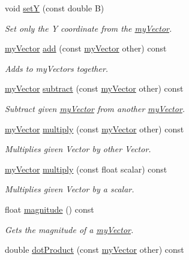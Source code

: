 \begin{DoxyCompactItemize}
void \hyperlink{classmy_vector_a67046769203977128c5869519a96981c}{set\+Y} (const double B)
\begin{DoxyCompactList}\small\item\em Set only the Y coordinate from the \hyperlink{classmy_vector}{my\+Vector}. \end{DoxyCompactList}\item 
\hyperlink{classmy_vector}{my\+Vector} \hyperlink{classmy_vector_ab6e4440c74a6cd118faa925a8fddedc9}{add} (const \hyperlink{classmy_vector}{my\+Vector} other) const 
\begin{DoxyCompactList}\small\item\em Adds to my\+Vectors together. \end{DoxyCompactList}\item 
\hyperlink{classmy_vector}{my\+Vector} \hyperlink{classmy_vector_a43d29af4b84766a8b27c0a6e50067ead}{subtract} (const \hyperlink{classmy_vector}{my\+Vector} other) const 
\begin{DoxyCompactList}\small\item\em Subtract given \hyperlink{classmy_vector}{my\+Vector} from another \hyperlink{classmy_vector}{my\+Vector}. \end{DoxyCompactList}\item 
\hyperlink{classmy_vector}{my\+Vector} \hyperlink{classmy_vector_a34a7a3b4eeda62cf4e8dfa5e3e79fcaa}{multiply} (const \hyperlink{classmy_vector}{my\+Vector} other) const 
\begin{DoxyCompactList}\small\item\em Multiplies given Vector by other Vector. \end{DoxyCompactList}\item 
\hyperlink{classmy_vector}{my\+Vector} \hyperlink{classmy_vector_a9465f76761927752eea5a66664443500}{multiply} (const float scalar) const 
\begin{DoxyCompactList}\small\item\em Multiplies given Vector by a scalar. \end{DoxyCompactList}\item 
float \hyperlink{classmy_vector_a69838d6c85759fa2a2c82ea42f13b989}{magnitude} () const 
\begin{DoxyCompactList}\small\item\em Gets the magnitude of a \hyperlink{classmy_vector}{my\+Vector}. \end{DoxyCompactList}\item 
double \hyperlink{classmy_vector_af43d29d51639072515cad23ef7415786}{dot\+Product} (const \hyperlink{classmy_vector}{my\+Vector} other) const 

\end{DoxyCompactItemize}
